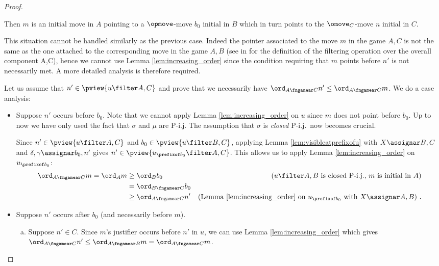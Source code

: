 \begin{proof}
\begin{enumerate}[1)]
        Then $m$ is an initial move in $A$
        pointing to a $\opmove$-move
        $b_0$ initial in $B$ which in turn points to the $\omove_C$-move $n$ initial in $C$.

        This situation cannot be handled similarly as the previous case. Indeed the pointer associated to the move $m$ in the game $A,C$ is not the same as the one attached to the corresponding move in the game $A,B$ (see in \cite{Abr02} for the definition of the  filtering operation over the overall component A,C), hence we cannot use Lemma \ref{lem:increasing_order} since the condition requiring that $m$ points before $n'$ is not necessarily met. A more detailed analysis is therefore required.

        Let us assume that $n'\in \pview{u\filter A,C}$ and
        prove that we necessarily have $\ord_{A\fngamear C} n' \leq \ord_{A\fngamear C} m$. We do a case analysis:
        \begin{itemize}[-]
        \item Suppose $n'$ occurs before $b_0$.
        Note that we cannot apply Lemma \ref{lem:increasing_order} on $u$
        since $m$ does not point before $b_0$.
        Up to now we have only used the fact that $\sigma$ and $\mu$ are P-i.j. The assumption that $\sigma$ is  \emph{closed} P-i.j.\ now becomes crucial.

        Since $n' \in \pview{u\filter A,C}$ and
        $b_0 \in \pview{u\filter B,C}$, applying Lemma \ref{lem:visibleatprefixofu}
        with $X\assignar B,C$ and $\delta,\gamma \assignar b_0,n'$ gives
        $n' \in \pview{u_{\prefixof b_0}\filter A,C}$. This allows us to apply Lemma \ref{lem:increasing_order} on $u_{\prefixof b_0}$:
            \begin{align*}
            \ord_{A\fngamear C} m
            = \ord_A m
            & \geq \ord_B b_0 & \mbox{($u \filter A,B$ is closed P-i.j., $m$ is initial in $A$)} \\
            & = \ord_{B\fngamear C} b_0  \\
            & \geq \ord_{A\fngamear C} n' & \mbox{(Lemma \ref{lem:increasing_order} on $u_{\prefixof b_0}$ with $X\assignar A,B$)} \ .
            \end{align*}

        \item Suppose $n'$ occurs after $b_0$ (and necessarily before $m$).

            \begin{enumerate}[a.]
            \item Suppose $n'\in C$. Since $m$'s justifier occurs before $n'$ in $u$, we can use Lemma \ref{lem:increasing_order} which gives $\ord_{A\fngamear C} n' \leq \ord_{A\fngamear B} m
                = \ord_{A\fngamear C} m$.


\end{enumerate}
\end{itemize}
\end{enumerate}
\end{proof}
